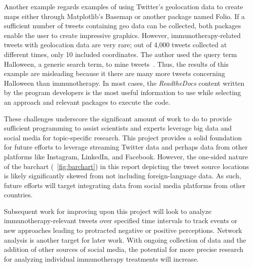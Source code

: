 Another example regards examples of using Twitter's 
geolocation data to create maps either through Matplotlib's 
Basemap or another package named Folio. If a
sufficient number of tweets containing geo data can be 
collected, both packages enable the user to create impressive 
graphics.  However, immunotherapy-related tweets
with geolocation data are very rare; out of 4,000 tweets
collected at different times, only 10 included
coordinates.  The author used the query term
Halloween, a generic search term, to mine tweets~\cite{ianbroad2014}.
Thus, the results of this example are
misleading because it there are many more tweets
concerning Halloween than immunotherapy.  In most
cases, the \emph{ReadtheDocs} content written by
the program developers is the most useful
information to use while selecting an approach and
relevant packages to execute the code.  

These challenges underscore the significant amount
of work to do to provide sufficient programming
to assist scientists and experts leverage big data
and social media for topic-specific research. 
This project provides a solid foundation for
future efforts to leverage streaming Twitter data
and perhaps data from other platforms like
Instagram, LinkedIn, and Facebook.  However, the one-sided 
nature of the barchart (~\ref{fig:barchart}) in this report 
depicting the tweet source locations is likely significantly
skewed from not including foreign-language data.  As such, 
future efforts will target integrating data from social media
platforms from other countries.  

Subsequent work for improving upon this project will look to
analyze immunotherapy-relevant tweets over specified time 
intervals to track events or new approaches leading to protracted 
negative or positive perceptions.  Network analysis is another 
target for later work.  With ongoing collection of data and the 
addition of other sources of social media, the potential for 
more precise research for analyzing individual immunotherapy 
treatments will increase.

\medskip


 


